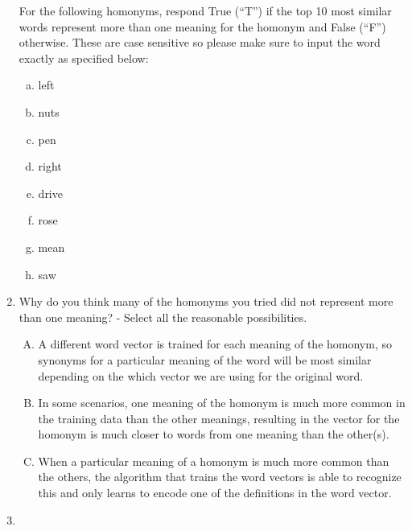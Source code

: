 \begin{enumerate}[1.]
For the following homonyms, respond True (``T'') if the top 10 most similar words represent more than one meaning for the homonym and False (``F'') otherwise. These are case sensitive so please make sure to input the word exactly as specified below:

\begin{enumerate}[a.]
\item left
\item nuts
\item pen
\item right
\item drive
\item rose
\item mean
\item saw
\end{enumerate}


\item {}

Why do you think many of the homonyms you tried did not represent more than one meaning? - Select all the reasonable possibilities.

\begin{enumerate}[A)]
\item A different word vector is trained for each meaning of the homonym, so synonyms for a particular meaning of the word will be most similar depending on the which vector we are using for the original word.

\item In some scenarios, one meaning of the homonym is much more common in the training data than the other meanings, resulting in the vector for the homonym is much closer to words from one meaning than the other(s).

\item When a particular meaning of a homonym is much more common than the others, the algorithm that trains the word vectors is able to recognize this and only learns to encode one of the definitions in the word vector.
\end{enumerate}


\item {}


\end{enumerate}
